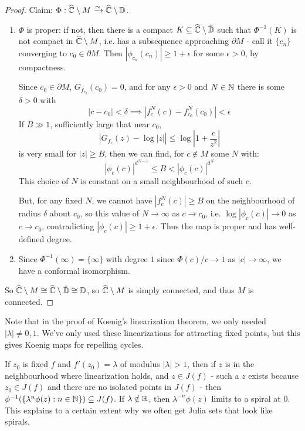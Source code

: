 \documentclass[10pt,a4paper]{article}
\begin{document}
\begin{proof}
  Claim: $\Phi : \widehat{\mathbb{C}}\setminus M \xrightarrow{\thicksim} \widehat{\mathbb{C}}\setminus \mathbb{D}$.

  \begin{enumerate}
    \item $\Phi$ is proper: if not, then there is a compact $K \subseteq \widehat{\mathbb{C}}\setminus\bar{\mathbb{D}}$ such that $\Phi^{-1}(K)$ is not compact in $\widehat{\mathbb{C}}\setminus M$, i.e. has a subsequence approaching $\partial M$ - call it $\{c_n\}$ converging to $c_0 \in \partial M$. Then $|\phi_{c_n}(c_n)|\geq 1+\epsilon$ for some $\epsilon >0$, by compactness.

    Since $c_0 \in \partial M$, $G_{f_{c_0}}(c_0)=0$, and for any $\epsilon > 0$ and $N \in \mathbb{N}$ there is some $\delta >0$ with
    \[|c-c_0|<\delta \implies |f_c^N(c)-f_{c_0}^N(c_0)|<\epsilon\]
    If $B \gg 1$, sufficiently large that near $c_0$,
    \[\left|G_{f_c}(z)-\log|z|\right| \leq \log \left|1+\frac{c}{z^2}\right|\]
    is very small for $|z|\geq B$, then we can find, for $c \notin M$ some $N$ with:
    \[|\phi_c(c)|^{d^{N-1}} \leq B < |\phi_c(c)|^{d^N}\]
    This choice of $N$ is constant on a small neighbourhood of such $c$.

    But, for any fixed $N$, we cannot have $|f_c^N(c)|\geq B$ on the neighbourhood of radius $\delta$ about $c_0$, so this value of $N \to \infty$ as $c \to c_0$, i.e. $\log|\phi_c(c)|\to 0$ as $c \to c_0$, contradicting $|\phi_c(c)|\geq 1+\epsilon$. Thus the map is proper and has well-defined degree.

    \item Since $\Phi^{-1}(\infty) = \{\infty\}$ with degree $1$ since $\Phi(c)/c \to 1$ as $|c| \to \infty$, we have a conformal isomorphism.
  \end{enumerate}
  So $\widehat{\mathbb{C}}\setminus M \cong \widehat{\mathbb{C}}\setminus\bar{\mathbb{D}} \cong \mathbb{D}$, so $\widehat{\mathbb{C}}\setminus M$ is simply connected, and thus $M$ is connected.
\end{proof}
Note that in the proof of Koenig's linearization theorem, we only needed $|\lambda|\neq 0,1$. We've only used these linearizations for attracting fixed points, but this gives Koenig maps for repelling cycles.

If $z_0$ is fixed $f$ and $f'(z_0) = \lambda$ of modulus $|\lambda|>1$, then if $z$ is in the neighbourhood where linearization holds, and $z \in J(f)$ - such a $z$ exists because $z_0 \in J(f)$ and there are no isolated points in $J(f)$ - then $\phi^{-1}(\{\lambda^n \phi(z):n \in \mathbb{N}\})\subseteq J(f)$. If $\lambda \notin \mathbb{R}$, then $\lambda^{-n}\phi(z)$ limits to a spiral at $0$. This explains to a certain extent why we often get Julia sets that look like spirals.
\end{document}
